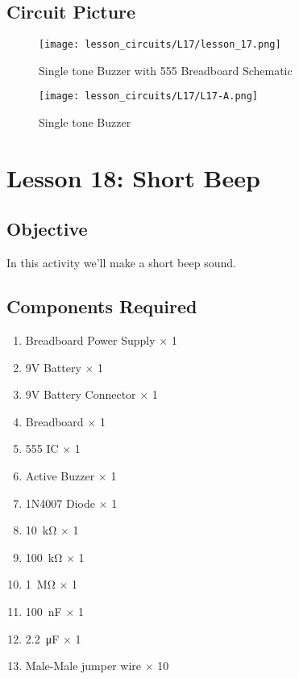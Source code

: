 \subsection{Circuit Picture}
\begin{figure}[!htp]
    \centering
    \texttt{[image: lesson\_circuits/L17/lesson\_17.png]}
    \caption{Single tone Buzzer with 555 Breadboard Schematic}
    \label{fig:555_sbuz_sch}
\end{figure}
\begin{figure}[!htp]
    \centering
    \texttt{[image: lesson\_circuits/L17/L17-A.png]}
    \caption{Single tone Buzzer}
    \label{fig:555_sbuz_obb}
\end{figure}
\section{Lesson 18: Short Beep}
\subsection{Objective}
In this activity we'll make a short beep sound.
\subsection{Components Required}
\begin{enumerate}
    \item Breadboard Power Supply $\times$ 1
    \item 9V Battery $\times$ 1
    \item 9V Battery Connector $\times$ 1
    \item Breadboard $\times$ 1
    \item 555 IC $\times$ 1
    \item Active Buzzer $\times$ 1
    \item 1N4007 Diode $\times$ 1
    \item \SI{10}{\kilo\ohm} $\times$ 1
    \item \SI{100}{\kilo\ohm} $\times$ 1
    \item \SI{1}{\Mohm} $\times$ 1
    \item \SI{100}{\nano\farad} $\times$ 1
    \item \SI{2.2}{\micro\farad} $\times$ 1
    \item Male-Male jumper wire $\times$ 10
\end{enumerate}
